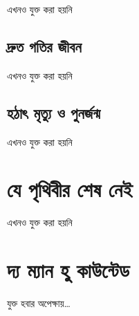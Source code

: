 \documentclass[
]{book}
\begin{document}
এখনও যুক্ত করা হয়নি

\hypertarget{fast-lane}{%
\section{দ্রুত গতির জীবন}\label{fast-lane}}

এখনও যুক্ত করা হয়নি

\hypertarget{sudden-death}{%
\section{হঠাৎ মৃত্যু ও পুনর্জন্ম}\label{sudden-death}}

এখনও যুক্ত করা হয়নি

\hypertarget{without-end}{%
\chapter{যে পৃথিবীর শেষ নেই}\label{without-end}}

এখনও যুক্ত করা হয়নি

\hypertarget{tmwc}{%
\chapter{দ্য ম্যান হু কাউন্টেড}\label{tmwc}}

যুক্ত হবার অপেক্ষায়\ldots{}
\end{document}
